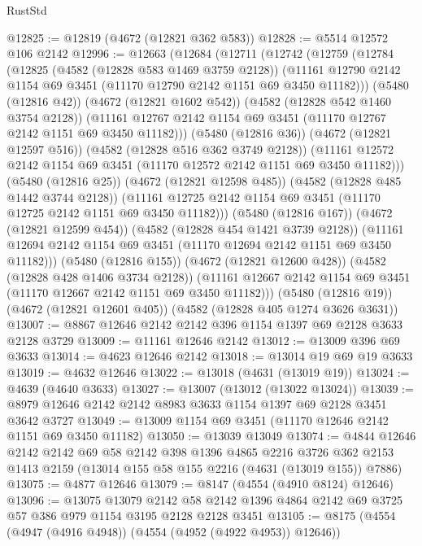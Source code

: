 \begin{lexlean}{RustStd}
\begin{coremodule}
{\begin{coremodule}
{{{{{{{{{{{{{{{{@12825 := @12819 (@4672 (@12821 @362 @583))
@12828 := @5514 @12572 @106 @2142
@12996 := @12663
    (@12684
      (@12711
        (@12742
          (@12759
            (@12784
              (@12825
                (@4582 (@12828 @583 @1469 @3759 @2128))
                (@11161 @12790 @2142 @1154 @69 @3451 (@11170 @12790 @2142 @1151 @69 @3450 @11182)))
              (@5480 (@12816 @42))
              (@4672 (@12821 @1602 @542))
              (@4582 (@12828 @542 @1460 @3754 @2128))
              (@11161 @12767 @2142 @1154 @69 @3451 (@11170 @12767 @2142 @1151 @69 @3450 @11182)))
            (@5480 (@12816 @36))
            (@4672 (@12821 @12597 @516))
            (@4582 (@12828 @516 @362 @3749 @2128))
            (@11161 @12572 @2142 @1154 @69 @3451 (@11170 @12572 @2142 @1151 @69 @3450 @11182)))
          (@5480 (@12816 @25))
          (@4672 (@12821 @12598 @485))
          (@4582 (@12828 @485 @1442 @3744 @2128))
          (@11161 @12725 @2142 @1154 @69 @3451 (@11170 @12725 @2142 @1151 @69 @3450 @11182)))
        (@5480 (@12816 @167))
        (@4672 (@12821 @12599 @454))
        (@4582 (@12828 @454 @1421 @3739 @2128))
        (@11161 @12694 @2142 @1154 @69 @3451 (@11170 @12694 @2142 @1151 @69 @3450 @11182)))
      (@5480 (@12816 @155))
      (@4672 (@12821 @12600 @428))
      (@4582 (@12828 @428 @1406 @3734 @2128))
      (@11161 @12667 @2142 @1154 @69 @3451 (@11170 @12667 @2142 @1151 @69 @3450 @11182)))
    (@5480 (@12816 @19))
    (@4672 (@12821 @12601 @405))
    (@4582 (@12828 @405 @1274 @3626 @3631))
@13007 := @8867 @12646 @2142 @2142 @396 @1154 @1397 @69 @2128 @3633 @2128 @3729
@13009 := @11161 @12646 @2142
@13012 := @13009 @396 @69 @3633
@13014 := @4623 @12646 @2142
@13018 := @13014 @19 @69 @19 @3633
@13019 := @4632 @12646
@13022 := @13018 (@4631 (@13019 @19))
@13024 := @4639 (@4640 @3633)
@13027 := @13007 (@13012 (@13022 @13024))
@13039 := @8979 @12646 @2142 @2142 @8983 @3633 @1154 @1397 @69 @2128 @3451 @3642 @3727
@13049 := @13009 @1154 @69 @3451 (@11170 @12646 @2142 @1151 @69 @3450 @11182)
@13050 := @13039 @13049
@13074 := @4844
    @12646
    @2142
    @2142
    @69
    @58
    @2142
    @398
    @1396
    @4865
    @2216
    @3726
    @362
    @2153
    @1413
    @2159
    (@13014 @155 @58 @155 @2216 (@4631 (@13019 @155)) @7886)
@13075 := @4877 @12646
@13079 := @8147 (@4554 (@4910 @8124) @12646)
@13096 := @13075
    @13079
    @2142
    @58
    @2142
    @1396
    @4864
    @2142
    @69
    @3725
    @57
    @386
    @979
    @1154
    @3195
    @2128
    @2128
    @3451
@13105 := @8175 (@4554 (@4947 (@4916 @4948)) (@4554 (@4952 (@4922 @4953)) @12646))
}}}}}}}}}}}}}}}}
\end{coremodule}}
\end{coremodule}
\end{lexlean}

